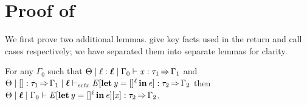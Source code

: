 
\section{Proof of }
\label{sec:preservation-proof}

We first prove two additional lemmas. 
 give key facts used in the return and
call cases respectively; we have separated them into separate lemmas for clarity.

\begin{lemma} %
  \label{lem:stack-well-typed}
  For any $\Gamma_{{\mathrm{0}}}$ such that $ \Theta   \mid   \ell  \ottsym{:}  \oldvec{\ell}   \mid   \Gamma_{{\mathrm{0}}}   \vdash   \mathit{x}  :  \tau_{{\mathrm{1}}}   \produces   \Gamma_{{\mathrm{1}}} $ and $\Theta  \mid  \HOLE  \ottsym{:}  \tau_{{\mathrm{1}}}  \produces  \Gamma_{{\mathrm{1}}}  \mid  \oldvec{\ell}  \vdash_{\mathit{ectx} }   \ottnt{E} [\LET  \mathit{y}  =   \HOLE^ \ell   \IN  \ottnt{e}  ]   \ottsym{:}  \tau_{{\mathrm{2}}}  \produces  \Gamma_{{\mathrm{2}}}$ then
  $ \Theta   \mid   \oldvec{\ell}   \mid   \Gamma_{{\mathrm{0}}}   \vdash    \ottnt{E} [\LET  \mathit{y}  =   \HOLE^ \ell   \IN  \ottnt{e}  ]   \ottsym{[}  \mathit{x}  \ottsym{]}  :  \tau_{{\mathrm{2}}}   \produces   \Gamma_{{\mathrm{2}}} $.
\end{lemma}
